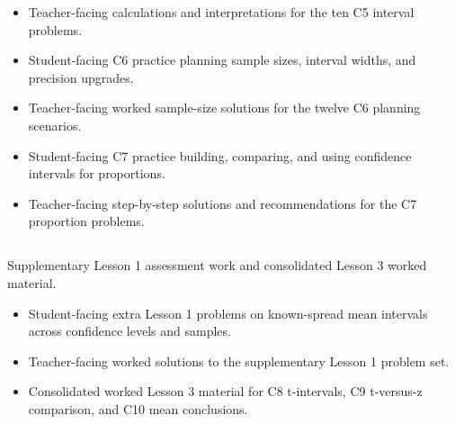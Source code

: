 \begin{itemize}
  \item {}

  Teacher-facing calculations and interpretations for the ten C5 interval problems.

  \item {}

  Student-facing C6 practice planning sample sizes, interval widths, and precision upgrades.

  \item {}

  Teacher-facing worked sample-size solutions for the twelve C6 planning scenarios.

  \item {}

  Student-facing C7 practice building, comparing, and using confidence intervals for proportions.

  \item {}

  Teacher-facing step-by-step solutions and recommendations for the C7 proportion problems.
\end{itemize}

\subsection{}

Supplementary Lesson 1 assessment work and consolidated Lesson 3 worked material.

\begin{itemize}
  \item {}

  Student-facing extra Lesson 1 problems on known-spread mean intervals across confidence levels and samples.

  \item {}

  Teacher-facing worked solutions to the supplementary Lesson 1 problem set.

  \item {}

  Consolidated worked Lesson 3 material for C8 t-intervals, C9 t-versus-z comparison, and C10 mean conclusions.
\end{itemize}

